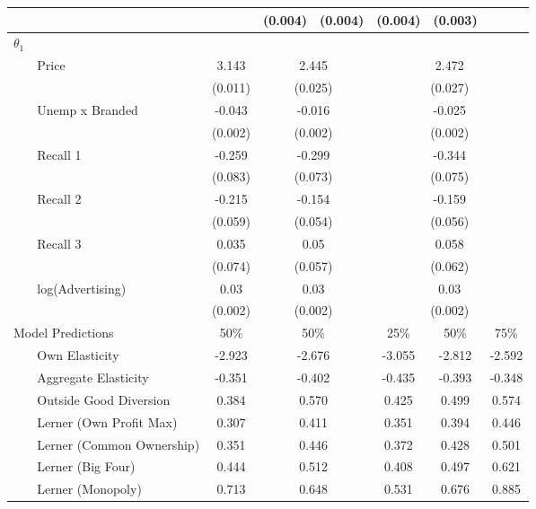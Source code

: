 \begin{tabular}{ll|c|cc|ccc}
{} &                   &               &       (0.004) &      (0.004) &     (0.004) &    (0.003) &          \\
\midrule 
 $\theta_1$ & & & & & & & \\ 
 \cmidrule(lr){1-1}\cmidrule{2-8} 
{} &            Price &\multicolumn{1}{c|}{3.143}&\multicolumn{2}{c|}{2.445}&\multicolumn{3}{c}{2.472} \\ 
{} &                  &\multicolumn{1}{c|}{(0.011)}&\multicolumn{2}{c|}{(0.025)}&\multicolumn{3}{c}{(0.027)} \\ 
{} &  Unemp x Branded &\multicolumn{1}{c|}{-0.043}&\multicolumn{2}{c|}{-0.016}&\multicolumn{3}{c}{-0.025} \\ 
{} &                  &\multicolumn{1}{c|}{(0.002)}&\multicolumn{2}{c|}{(0.002)}&\multicolumn{3}{c}{(0.002)} \\ 
{} &         Recall 1 &\multicolumn{1}{c|}{-0.259}&\multicolumn{2}{c|}{-0.299}&\multicolumn{3}{c}{-0.344} \\ 
{} &                  &\multicolumn{1}{c|}{(0.083)}&\multicolumn{2}{c|}{(0.073)}&\multicolumn{3}{c}{(0.075)} \\ 
{} &         Recall 2 &\multicolumn{1}{c|}{-0.215}&\multicolumn{2}{c|}{-0.154}&\multicolumn{3}{c}{-0.159} \\ 
{} &                  &\multicolumn{1}{c|}{(0.059)}&\multicolumn{2}{c|}{(0.054)}&\multicolumn{3}{c}{(0.056)} \\ 
{} &         Recall 3 &\multicolumn{1}{c|}{0.035}&\multicolumn{2}{c|}{0.05}&\multicolumn{3}{c}{0.058} \\ 
{} &                  &\multicolumn{1}{c|}{(0.074)}&\multicolumn{2}{c|}{(0.057)}&\multicolumn{3}{c}{(0.062)} \\ 
{} & log(Advertising) &\multicolumn{1}{c|}{0.03}&\multicolumn{2}{c|}{0.03}&\multicolumn{3}{c}{0.03} \\ 
{} &                  &\multicolumn{1}{c|}{(0.002)}&\multicolumn{2}{c|}{(0.002)}&\multicolumn{3}{c}{(0.002)} \\ 
\midrule 
 \multicolumn{2}{l|}{Model Predictions} &  50\% & \multicolumn{2}{c|}{50\%} & 25\% & 50\% & 75\%  \\ 
 \midrule 
 & Own Elasticity           & -2.923 &\multicolumn{2}{c|}{ -2.676 }& -3.055 & -2.812 & -2.592 \\
 & Aggregate Elasticity     & -0.351 &\multicolumn{2}{c|}{ -0.402 }& -0.435 & -0.393 & -0.348 \\
& Outside Good Diversion    &  0.384 &\multicolumn{2}{c|}{  0.570 }&  0.425 &  0.499 &  0.574 \\
\cmidrule{2-8}  
& Lerner (Own Profit Max)   &  0.307 &\multicolumn{2}{c|}{  0.411 }&  0.351 &  0.394 &  0.446 \\
& Lerner (Common Ownership) &  0.351 &\multicolumn{2}{c|}{  0.446 }&  0.372 &  0.428 &  0.501 \\
& Lerner (Big Four)         &  0.444 &\multicolumn{2}{c|}{  0.512 }&  0.408 &  0.497 &  0.621 \\
& Lerner (Monopoly)         &  0.713 &\multicolumn{2}{c|}{  0.648 }&  0.531 &  0.676 &  0.885 \\
\bottomrule 
\end{tabular}
